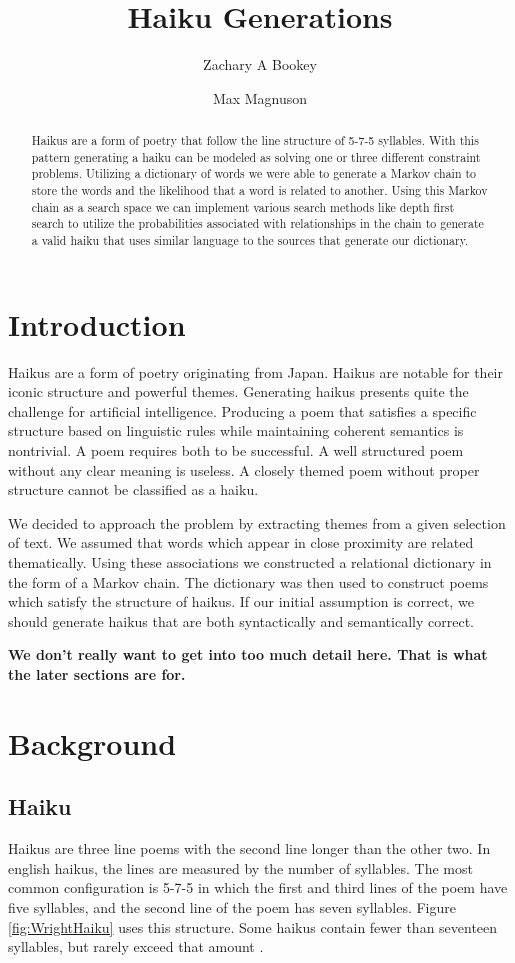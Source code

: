\documentclass[]{article}
\title{Haiku Generations}
\author{Zachary A Bookey \and Max Magnuson}
\newcommand{\comment}[1]
{\par {\bfseries \color{green} #1 \par}}
\begin{document}
\maketitle

\begin{abstract}
Haikus are a form of poetry that follow the line structure of 5-7-5 syllables. With this pattern generating a haiku can be modeled as solving one or three different constraint problems. Utilizing a dictionary of words we were able to generate a Markov chain to store the words and the likelihood that a word is related to another. Using this Markov chain as a search space we can implement various search methods like depth first search to utilize the probabilities associated with relationships in the chain to generate a valid haiku that uses similar language to the sources that generate our dictionary.
\end{abstract}

\section{Introduction}
Haikus are a form of poetry originating from Japan. Haikus are notable for their iconic structure and powerful themes. Generating haikus presents quite the challenge for artificial intelligence. Producing a poem that satisfies a specific structure based on linguistic rules while maintaining coherent semantics is nontrivial. A poem requires both to be successful. A well structured poem without any clear meaning is useless. A closely themed poem without proper structure cannot be classified as a haiku.

We decided to approach the problem by extracting themes from a given selection of text. We assumed that words which appear in close proximity are related thematically. Using these associations we constructed a relational dictionary in the form of a Markov chain. The dictionary was then used to construct poems which satisfy the structure of haikus. If our initial assumption is correct, we should generate haikus that are both syntactically and semantically correct.
\comment{We don't really want to get into too much detail here. That is what the later sections are for.}

\section{Background}

\subsection{Haiku}
Haikus are three line poems with the second line longer than the other two. In english haikus, the lines are measured by the number of syllables. The most common configuration is 5-7-5 in which the first and third lines of the poem have five syllables, and the second line of the poem has seven syllables. Figure \ref{fig:WrightHaiku} uses this structure. Some haikus contain fewer than seventeen syllables, but rarely exceed that amount \cite{Higginson}.
\end{document}
